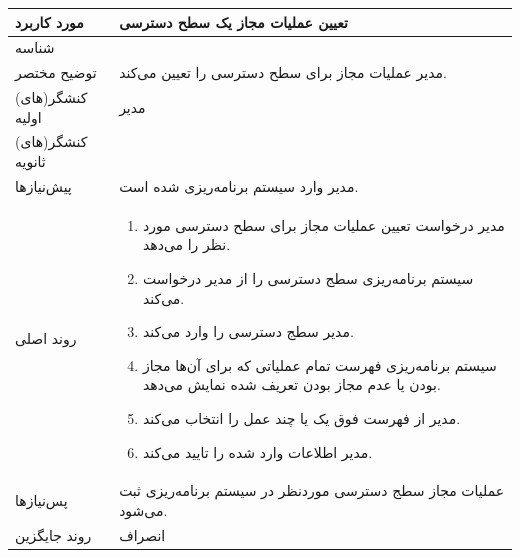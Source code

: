 \begin{table}[H]
	\centering
	\begin{tabular}{|p{3cm}|p{10cm}|}
		\hline
		مورد کاربرد & تعیین عملیات مجاز یک سطح دسترسی  \\
		\hline
		شناسه & 
		\stepcounter{usecase_ID}
		\arabic{usecase_ID} \\
		\hline
		توضیح مختصر & مدیر عملیات مجاز برای سطح دسترسی را تعیین می‌کند. \\
		\hline
		کنشگر(های) اولیه & مدیر \\
		\hline
		کنشگر(های) ثانویه &  \\
		\hline
		پیش‌نیازها & مدیر وارد سیستم برنامه‌ریزی شده است. \\
		\hline
		
		روند اصلی &
		\begin{enumerate}[topsep=0cm,leftmargin=0.5cm]
			\item مدیر درخواست تعیین عملیات مجاز برای سطح دسترسی مورد نظر را می‌دهد.
			\item سیستم برنامه‌ریزی سطج دسترسی را از مدیر درخواست می‌کند.
			\item مدیر سطج دسترسی را وارد می‌کند.
			\item سیستم برنامه‌ریزی فهرست تمام عملیاتی که برای آن‌ها مجاز بودن یا عدم مجاز بودن تعریف شده نمایش می‌دهد.
			\item مدیر از فهرست فوق یک یا چند عمل را انتخاب می‌کند.
			\item مدیر اطلاعات وارد شده را تایید می‌کند.
		\end{enumerate} \\
		
		\hline
		پس‌نیازها & عملیات مجاز سطج دسترسی موردنظر در سیستم برنامه‌ریزی  ثبت می‌شود. \\
		\hline
		روند جایگزین & انصراف \\
		\hline
	\end{tabular}
\end{table}


